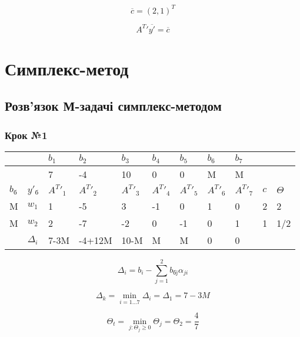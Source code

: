 \documentclass[a4paper, 12pt]{article}
\begin{document}
\begin{equation*}
 \overline{c} = \left( 2, 1 \right)^T
\end{equation*}

\begin{equation*}
 A^T{'}\overline{y'} = \overline{c}
\end{equation*}


\section{Симплекс-метод}

\subsection{Розв'язок М-задачі симплекс-методом}

\subsubsection{Крок №1}

\begin{table}[H]
    \centering
    \begin{tabular}{|l|l|l|l|l|l|l|l|l|l|l|}
    \hline
         &  & $b_1$ & $b_2$ & $b_3$ & $b_4$ & $b_5$ & $b_6$ & $b_7$ & & \\ \hline
         &  & 7 & -4 & 10 & 0 & 0 & M & M & &  \\ \hline
         $b_\text{б}$ & $y'_\text{б}$ & $A^T{'}_1$ & $A^T{'}_2$ & $A^T{'}_3$ & $A^T{'}_4$ & $A^T{'}_5$ & $A^T{'}_6$ & $A^T{'}_7$ & $c$  & $\Theta$ \\ \hline
        M & $w_1$ & 1 & -5 & 3 & -1 & 0 & 1 & 0 & 2 & 2 \\ \hline
        M & $w_2$ & 2 & -7 & -2 & 0 & -1 & 0 & 1 & 1 & 1/2 \\ \hline
         & $\Delta_i$ & 7-3M & -4+12M & 10-M & M & M & 0 & 0 & &  \\ \hline
    \end{tabular}
\end{table}

\begin{equation*}
	\Delta_i = b_i - \sum_{j=1}^{2} b_\text{бj} \alpha_{ji}  
\end{equation*}

\begin{equation*}
	\Delta_k = \min_{i=1 \dots 7} \Delta_i = \Delta_1 = 7-3M
\end{equation*}

\begin{equation*}
	\Theta_t = \min_{j: \Theta_j \geqslant 0} \Theta_j = \Theta_2 = \frac{4}{7}
\end{equation*}
\end{document}
